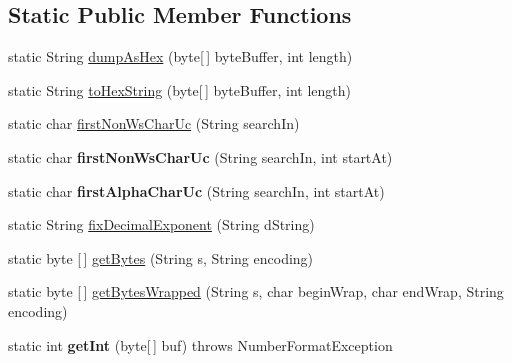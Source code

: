\subsection*{Static Public Member Functions}
\begin{DoxyCompactItemize}
\item 
static String \mbox{\hyperlink{classcom_1_1mysql_1_1cj_1_1util_1_1_string_utils_a4e06b22b83cf91a4332b171d4d8b3553}{dump\+As\+Hex}} (byte\mbox{[}$\,$\mbox{]} byte\+Buffer, int length)
\item 
static String \mbox{\hyperlink{classcom_1_1mysql_1_1cj_1_1util_1_1_string_utils_a5ecf6c0b370e9f9fe6f9e05fad3f6026}{to\+Hex\+String}} (byte\mbox{[}$\,$\mbox{]} byte\+Buffer, int length)
\item 
static char \mbox{\hyperlink{classcom_1_1mysql_1_1cj_1_1util_1_1_string_utils_af86b1077afb79a0d47ea738df3933c13}{first\+Non\+Ws\+Char\+Uc}} (String search\+In)
\item 
\mbox{\label{classcom_1_1mysql_1_1cj_1_1util_1_1_string_utils_a61a0495e590c4a8acbbd552abf13046c}} 
static char {\bfseries first\+Non\+Ws\+Char\+Uc} (String search\+In, int start\+At)
\item 
\mbox{\label{classcom_1_1mysql_1_1cj_1_1util_1_1_string_utils_a0824c6085207a70a49d56d58691714ef}} 
static char {\bfseries first\+Alpha\+Char\+Uc} (String search\+In, int start\+At)
\item 
static String \mbox{\hyperlink{classcom_1_1mysql_1_1cj_1_1util_1_1_string_utils_a08f760ff86a02721422aa21707cfb80b}{fix\+Decimal\+Exponent}} (String d\+String)
\item 
static byte \mbox{[}$\,$\mbox{]} \mbox{\hyperlink{classcom_1_1mysql_1_1cj_1_1util_1_1_string_utils_a460ad9e9bb0873d806d2078891d8d416}{get\+Bytes}} (String s, String encoding)
\item 
static byte \mbox{[}$\,$\mbox{]} \mbox{\hyperlink{classcom_1_1mysql_1_1cj_1_1util_1_1_string_utils_aa586cd6c16fa10c7a9d6f29d06fcfd9d}{get\+Bytes\+Wrapped}} (String s, char begin\+Wrap, char end\+Wrap, String encoding)
\item 
\mbox{\label{classcom_1_1mysql_1_1cj_1_1util_1_1_string_utils_a0653402c5cb3efdbb51da23ad159673d}} 
static int {\bfseries get\+Int} (byte\mbox{[}$\,$\mbox{]} buf)  throws Number\+Format\+Exception 

\end{DoxyCompactItemize}
